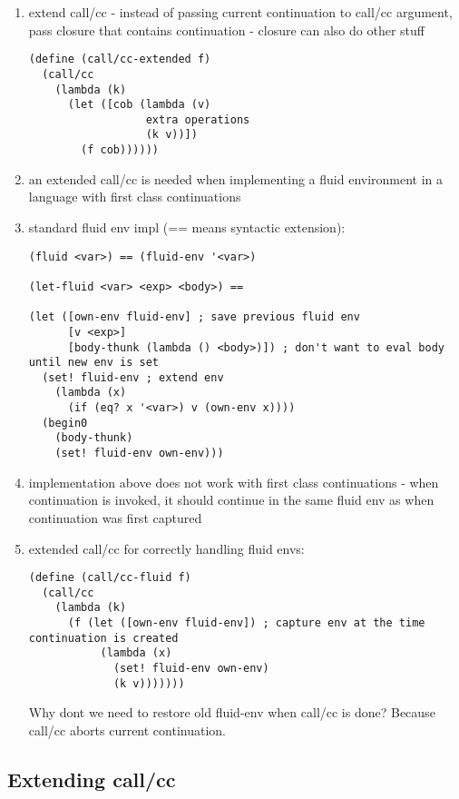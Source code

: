 \documentclass[letterpaper]{llncs}
\begin{document}
\begin{enumerate}
	\item extend call/cc - instead of passing current continuation to call/cc argument, pass closure that contains continuation - closure can also do other stuff
\begin{verbatim}
(define (call/cc-extended f)
  (call/cc
    (lambda (k)
      (let ([cob (lambda (v)
                  extra operations
                  (k v))])
        (f cob))))))
\end{verbatim}
	\item an extended call/cc is needed when implementing a fluid environment in a language with first class continuations
	\item standard fluid env impl (== means syntactic extension):
\begin{verbatim}
(fluid <var>) == (fluid-env '<var>)

(let-fluid <var> <exp> <body>) ==

(let ([own-env fluid-env] ; save previous fluid env
      [v <exp>]
      [body-thunk (lambda () <body>)]) ; don't want to eval body until new env is set
  (set! fluid-env ; extend env
    (lambda (x)
      (if (eq? x '<var>) v (own-env x))))
  (begin0
    (body-thunk)
    (set! fluid-env own-env)))
\end{verbatim}
	\item implementation above does not work with first class continuations - when continuation is invoked, it should continue in the same fluid env as when continuation was first captured
	\item extended call/cc for correctly handling fluid envs:
\begin{verbatim}
(define (call/cc-fluid f)
  (call/cc
    (lambda (k)
      (f (let ([own-env fluid-env]) ; capture env at the time continuation is created
           (lambda (x)
             (set! fluid-env own-env)
             (k v)))))))
\end{verbatim}
Why dont we need to restore old fluid-env when call/cc is done? Because call/cc aborts current continuation.
\end{enumerate}

\subsection*{Extending call/cc}
\end{document}
